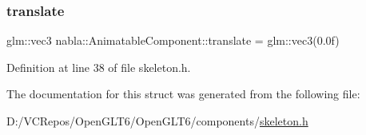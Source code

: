 \subsubsection{\texorpdfstring{translate}{translate}}
{\footnotesize\ttfamily glm\+::vec3 nabla\+::\+Animatable\+Component\+::translate = glm\+::vec3(0.\+0f)}



Definition at line 38 of file skeleton.\+h.



The documentation for this struct was generated from the following file\+:\begin{DoxyCompactItemize}
\item 
D\+:/\+V\+C\+Repos/\+Open\+G\+L\+T6/\+Open\+G\+L\+T6/components/\mbox{\hyperlink{skeleton_8h}{skeleton.\+h}}\end{DoxyCompactItemize}
